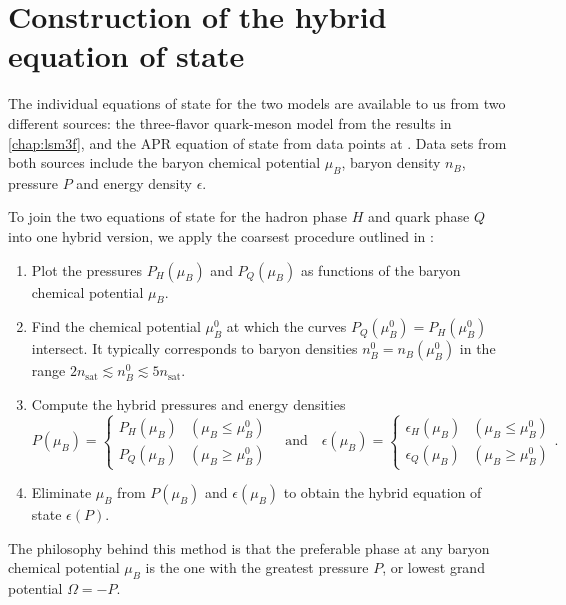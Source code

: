 \section{Construction of the hybrid equation of state}
\label{sec:hybrid:construction}

The individual equations of state for the two models are available to us from two different sources:
the three-flavor quark-meson model from the results in \cref{chap:lsm3f},
and the APR equation of state from data points at \cite{ref:apr_data}.
Data sets from both sources include the baryon chemical potential $\mu_B$, baryon density $n_B$, pressure $P$ and energy density $\epsilon$.

To join the two equations of state for the hadron phase $H$ and quark phase $Q$ into one hybrid version,
we apply the coarsest procedure outlined in \cite[section V-C]{ref:quark_star_review}:
\begin{enumerate}
\item \label{step:hybrid:one}%
      Plot the pressures $P_H(\mu_B)$ and $P_Q(\mu_B)$ as functions of the baryon chemical potential $\mu_B$.
\item \label{step:hybrid:two}%
      Find the chemical potential $\mu_B^0$ at which the curves $P_Q(\mu_B^0) = P_H(\mu_B^0)$ intersect.
      It typically corresponds to baryon densities $n_B^0 = n_B(\mu_B^0)$ in the range $2 n_\text{sat} \lesssim n_B^0 \lesssim 5 n_\text{sat}$.
\item \label{step:hybrid:three}%
      Compute the hybrid pressures and energy densities
      \begin{equation}
          P(\mu_B) = \begin{cases} P_H(\mu_B) & (\mu_B \leq \mu_B^0) \\ P_Q(\mu_B) & (\mu_B \geq \mu_B^0)  \end{cases}
          \quad \text{and} \quad
          \epsilon(\mu_B) = \begin{cases} \epsilon_H(\mu_B) & (\mu_B \leq \mu_B^0) \\ \epsilon_Q(\mu_B) & (\mu_B \geq \mu_B^0) \end{cases}.
      \label{eq:hybrid:pressure_energy_density}
      \end{equation}
\item \label{step:hybrid:four}%
      Eliminate $\mu_B$ from $P(\mu_B)$ and $\epsilon(\mu_B)$ to obtain the hybrid equation of state $\epsilon(P)$.
\end{enumerate}
The philosophy behind this method is that the preferable phase at any baryon chemical potential $\mu_B$ is the one with the greatest pressure $P$, or lowest grand potential $\Omega = -P$.

